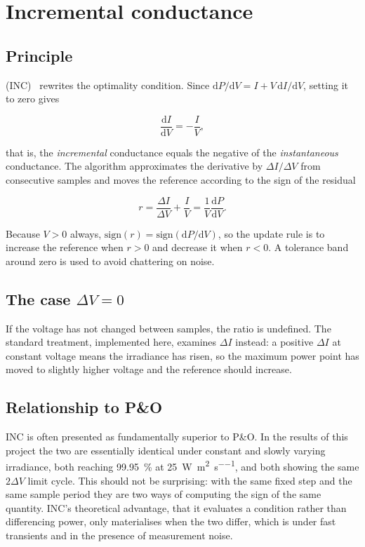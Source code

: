 \section{Incremental conductance}

\subsection{Principle}

 (INC)~\cite{hussein} rewrites the optimality
condition. Since $\mathrm{d}P/\mathrm{d}V = I + V\,\mathrm{d}I/\mathrm{d}V$,
setting it to zero gives

\begin{equation}
\frac{\mathrm{d}I}{\mathrm{d}V} = -\frac{I}{V},
\end{equation}

that is, the \emph{incremental} conductance equals the negative of the
\emph{instantaneous} conductance. The algorithm approximates the derivative by
$\Delta I / \Delta V$ from consecutive samples and moves the reference according
to the sign of the residual

\begin{equation}
r = \frac{\Delta I}{\Delta V} + \frac{I}{V} = \frac{1}{V}\frac{\mathrm{d}P}{\mathrm{d}V} .
\end{equation}

Because $V > 0$ always, $\mathrm{sign}(r) = \mathrm{sign}(\mathrm{d}P/\mathrm{d}V)$,
so the update rule is to increase the reference when $r > 0$ and decrease it
when $r < 0$. A tolerance band around zero is used to avoid chattering on noise.

\subsection{The case $\Delta V = 0$}

If the voltage has not changed between samples, the ratio is undefined. The
standard treatment, implemented here, examines $\Delta I$ instead: a positive
$\Delta I$ at constant voltage means the irradiance has risen, so the maximum
power point has moved to slightly higher voltage and the reference should
increase.

\subsection{Relationship to P\&O}

INC is often presented as fundamentally superior to P\&O. In the results of this
project the two are essentially identical under constant and slowly varying
irradiance, both reaching \SI{99.95}{\percent} at \SI{25}{\watt\per\square\metre\per\second},
and both showing the same $2\Delta V$ limit cycle. This should not be
surprising: with the same fixed step and the same sample period they are two
ways of computing the sign of the same quantity. INC's theoretical advantage,
that it evaluates a condition rather than differencing power, only materialises
when the two differ, which is under fast transients and in the presence of
measurement noise.

